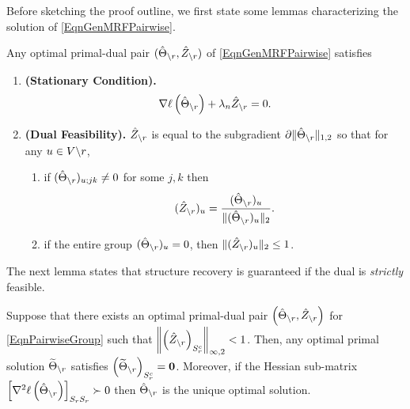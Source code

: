 Before sketching the proof outline, we first state some lemmas characterizing the solution of \eqref{EqnGenMRFPairwise}. 
\begin{lemma} 
Any optimal primal-dual pair $(\hat{\Theta}_{\backslash r},\hat{Z}_{\backslash r})$ of \eqref{EqnGenMRFPairwise} satisfies
\label{NecessaryOptCondition}
\begin{enumerate}
\item  {\bf (Stationary Condition).}
\begin{align}\label{EqnStatCondPairwise}
\nabla\ell\left(\hat{\Theta}_{\backslash r}\right) + \lambda_n \hat{Z}_{\backslash r} = 0.
\end{align}

\item {\bf (Dual Feasibility).} $\hat{Z}_{\backslash r}$ is equal to the subgradient $\partial \| \hat{\Theta}_{\backslash r}\|_{1,2}$ so that
for any $u \in V \backslash r$,
\begin{enumerate}
\item if $(\hat{\Theta}_{\backslash r})_{u;jk} \neq 0$ for some $j,k$ then 
\[(\hat{Z}_{\backslash r})_{u} = \frac{(\hat{\Theta}_{\backslash r})_{u}}{\|(\hat{\Theta}_{\backslash r})_{u}\|_{2}}.\]
\item if the entire group $(\hat{\Theta}_{\backslash r})_{u} = 0$, then $\|(\hat{Z}_{\backslash r})_{u}\|_{2} \le 1$.
\end{enumerate}

\end{enumerate}
\end{lemma}

The next lemma states that structure recovery is guaranteed if the dual is \emph{strictly} feasible. 
\begin{lemma}
\label{LemSuffOptCond} 
Suppose that there exists an optimal primal-dual pair $\left(\hat{\Theta}_{\backslash r},\hat{Z}_{\backslash r}\right)$ for \eqref{EqnPairwiseGroup} such that $\left\|\left(\hat{Z}_{\backslash r}\right)_{S^c_{r}}\right\|_{\infty,2}<1$. Then, any optimal primal solution $\widetilde{\Theta}_{\backslash r}$ satisfies $\left(\widetilde{\Theta}_{\backslash r}\right)_{S^c_{r}}=\mathbf{0}$. Moreover, if the Hessian sub-matrix $\left[\nabla^2\ell\left(\hat{\Theta}_{\backslash r}\right)\right]_{S_{r}S_{r}}\succ 0$ then $\hat{\Theta}_{\backslash r}$ is the unique optimal solution.\\
\label{SuffOptCond}
\end{lemma}


